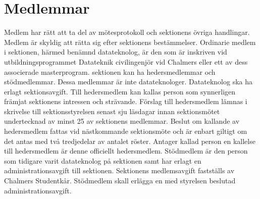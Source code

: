 \documentclass[a4paper]{dteklag}
\begin{document}
\section{Medlemmar}
\para Medlem har rätt att ta del av mötesprotokoll och sektionens övriga handlingar.
\para Medlem är skyldig att rätta sig efter sektionens bestämmelser.
\para[Datateknologer] Ordinarie medlem i sektionen, härmed benämnd datateknolog, är den som är inskriven vid utbildningsprogrammet Datateknik civilingenjör vid Chalmers eller ett av dess associerade masterprogram. 
\para sektionen kan ha hedersmedlemmar och stödmedlemmar.
\stycke Dessa medlemmar är inte datateknologer.
\para Datateknolog ska ha erlagt sektionsavgift.
\para[Hedersmedlem] Till hedersmedlem kan kallas person som synnerligen främjat sektionens intressen och strävande.
\para Förslag till hedersmedlem lämnas i skrivelse till sektionsstyrelsen senast sju läsdagar innan sektionsmötet undertecknad av minst 25 av sektionens medlemmar.
\para Beslut om kallande av hedersmedlem fattas vid nästkommande sektionsmöte och är enbart giltigt om det antas med två tredjedelar av antalet röster.
\para Antager kallad person en kallelse till hedersmedlem är denne officiellt hedersmedlem.
\para[Stödmedlem] Stödmedlem är den person som tidigare varit datateknolog på sektionen samt har erlagt en administrationsavgift till sektionen.
\para[Avgifter] Sektionens medlemsavgift fastställs av Chalmers Studentkår.
\para Stödmedlem skall erlägga en med styrelsen beslutad administrationsavgift.
\end{document}
